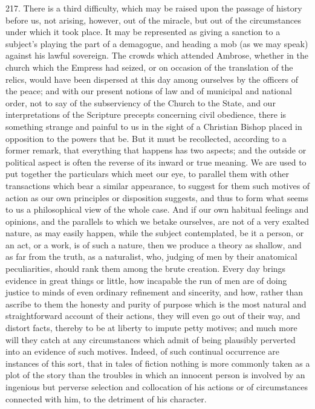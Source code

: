 217.
There is a third difficulty, which may be raised upon the passage of
history before us, not arising, however, out of the miracle, but out
of the circumstances under which it took place. It may be represented
as giving a sanction to a subject's playing the part of a demagogue,
and heading a mob (as we may speak) against his lawful sovereign. The
crowds which attended Ambrose, whether in the church which the Empress
had seized, or on occasion of the translation of the relics, would
have been dispersed at this day among ourselves by the officers of the
peace; and with our present notions of law and of municipal and
national order, not to say of the subserviency of the Church to the
State, and our interpretations of the Scripture precepts concerning
civil obedience, there is something strange and painful to us in the
sight of a Christian Bishop placed in opposition to the powers that
be. But it must be recollected, according to a former remark, that
everything that happens has two aspects; and the outside or political
aspect is often the reverse of its inward or true meaning. We are used
to put together the particulars which meet our eye, to parallel them
with other transactions which bear a similar appearance, to suggest
for them such motives of action as our own principles or disposition
suggests, and thus to form what seems to us a philosophical view
of the whole case. And if our own habitual feelings and opinions, and
the parallels to which we betake ourselves, are not of a very exalted
nature, as may easily happen, while the subject contemplated, be it a
person, or an act, or a work, is of such a nature, then we produce a
theory as shallow, and as far from the truth, as a naturalist, who,
judging of men by their anatomical peculiarities, should rank them
among the brute creation. Every day brings evidence in great things or
little, how incapable the run of men are of doing justice to minds of
even ordinary refinement and sincerity, and how, rather than ascribe
to them the honesty and purity of purpose which is the most natural
and straightforward account of their actions, they will even go out of
their way, and distort facts, thereby to be at liberty to impute petty
motives; and much more will they catch at any circumstances which
admit of being plausibly perverted into an evidence of such motives.
Indeed, of such continual occurrence are instances of this sort, that
in tales of fiction nothing is more commonly taken as a plot of the
story than the troubles in which an innocent person is involved by an
ingenious but perverse selection and collocation of his actions or of
circumstances connected with him, to the detriment of his character.

